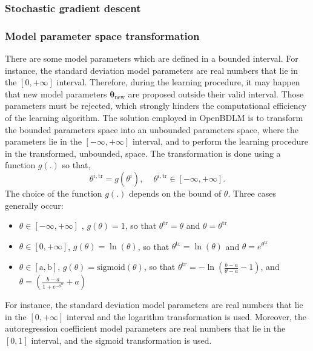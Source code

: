 \subsubsection{Stochastic gradient descent}

\noindent {}

\subsubsection{Model parameter space transformation}
\label{SS:THSpaceTransformation}

There are some model parameters which are defined in a bounded interval.
For instance, the standard deviation model parameters are real numbers that lie in the $[0, +\infty]$ interval.
Therefore, during the learning procedure, it may happen that new model parameters $\bm\theta_{\text{new}}$ are proposed outside their valid interval.
Those parameters must be rejected, which strongly hinders the computational efficiency of the learning algorithm.
The solution employed in OpenBDLM is to transform the bounded parameters space into an unbounded parameters space, where the parameters lie in the $[ -\infty, +\infty ]$ interval, and to perform the learning procedure in the transformed, unbounded, space.
The transformation is done using a function $g(.)$ so that, 
\begin{equation}
\theta^{i, \text{tr}} = g(\theta^{i}) \text{, }\quad \theta^{i, \text{tr}} \in [-\infty, +\infty ] \text{.}
\end{equation}
The choice of the function $g(.)$ depends on the bound of $\theta$. 
Three cases generally occur:
\begin{itemize}
\item $ \theta \in [-\infty, +\infty ]$ , $g(\theta) = 1$, so that $\theta^{\text{tr}} = \theta$ and $\theta = \theta^{\text{tr}} $
\item $ \theta \in [0, +\infty ]$, $g(\theta) = \ln(\theta)$, so that $\theta^{\text{tr}} = \ln(\theta) $ and $\theta = e^{\theta^{\text{tr}}} $
\item $ \theta \in [\text{a}, \text{b}]$, $g(\theta) = \text{sigmoid}(\theta)$, so that $\theta^{\text{tr}} = -\ln \left( \frac{b-a}{\theta-a} - 1\right) $, and $\theta = \left( \frac{b-a}{1+e^{-\theta^{\text{tr}}}} + a \right)$
\end{itemize}
For instance, the standard deviation model parameters are real numbers that lie in the $[0, +\infty]$ interval and the logarithm transformation is used.
Moreover, the autoregression coefficient model parameters are real numbers that lie in the $[0, 1]$ interval, and the sigmoid transformation is used.

